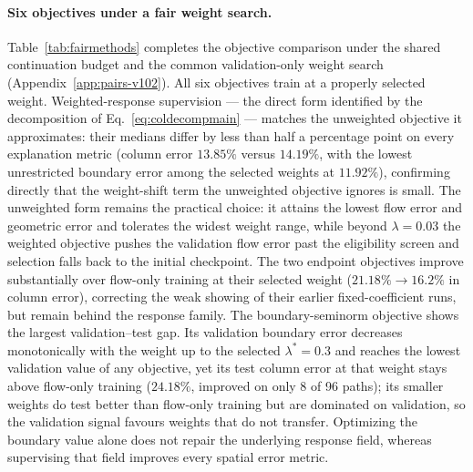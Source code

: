\paragraph{Six objectives under a fair weight search.}
Table~\ref{tab:fairmethods} completes the objective comparison under
the shared continuation budget and the common validation-only weight
search (Appendix~\ref{app:pairs-v102}). All six objectives train at a
properly selected weight. Weighted-response supervision --- the direct
form identified by the decomposition of
Eq.~\eqref{eq:coldecompmain} --- matches the unweighted objective it
approximates: their medians differ by less than half a percentage
point on every explanation metric (column error $13.85\%$ versus
$14.19\%$, with the lowest unrestricted boundary error among the
selected weights at $11.92\%$), confirming directly that the
weight-shift term the
unweighted objective ignores is small. The unweighted form remains the
practical choice: it attains the lowest flow error and geometric
error and tolerates the widest weight range, while beyond
$\lambda=0.03$ the weighted objective pushes the validation flow
error past the eligibility screen and selection falls back to the
initial checkpoint. The two endpoint objectives improve substantially
over flow-only training at their selected weight
($21.18\%\to16.2\%$ in column error), correcting the weak showing of
their earlier fixed-coefficient runs, but remain behind the response
family. The boundary-seminorm objective shows the largest
validation--test gap. Its validation boundary error decreases
monotonically with the weight up to the selected $\lambda^*=0.3$ and
reaches the lowest validation value of any objective, yet its test
column error at that weight stays above flow-only training
($24.18\%$, improved on only 8 of 96 paths); its smaller weights do
test better than flow-only training but are dominated on validation,
so the validation signal favours weights that do not transfer.
Optimizing the boundary value alone does not repair the underlying
response field, whereas supervising that field improves every spatial
error metric.
